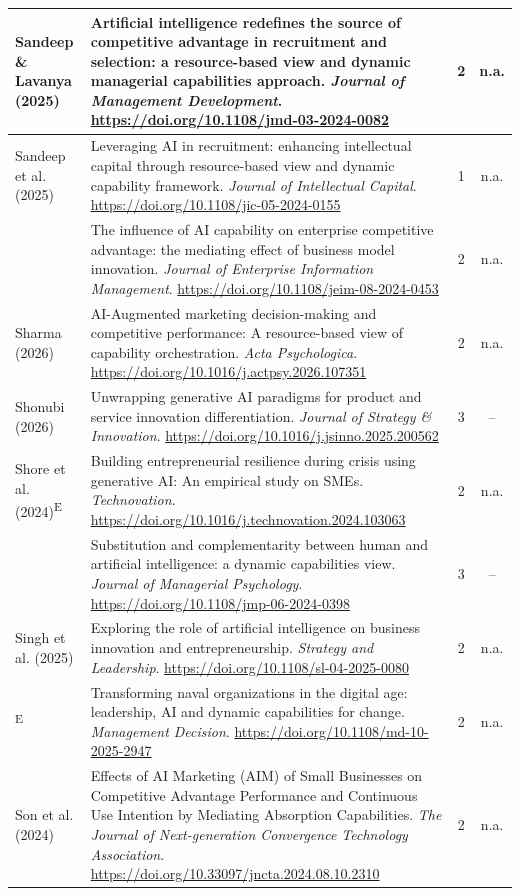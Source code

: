 {\begin{longtable}{|>{\raggedright\arraybackslash}p{2.6cm}|>{\raggedright\arraybackslash}p{10.2cm}|c|c|}
Sandeep \& Lavanya (2025) & Artificial intelligence redefines the source of competitive advantage in recruitment and selection: a resource-based view and dynamic managerial capabilities approach. \textit{Journal of Management Development}. \url{https://doi.org/10.1108/jmd-03-2024-0082} & 2 & n.a. \\ \hline
Sandeep et al. (2025) & Leveraging AI in recruitment: enhancing intellectual capital through resource-based view and dynamic capability framework. \textit{Journal of Intellectual Capital}. \url{https://doi.org/10.1108/jic-05-2024-0155} & 1 & n.a. \\ \hline
\textcite{shao2026} & The influence of AI capability on enterprise competitive advantage: the mediating effect of business model innovation. \textit{Journal of Enterprise Information Management}. \url{https://doi.org/10.1108/jeim-08-2024-0453} & 2 & n.a. \\ \hline
Sharma (2026) & AI-Augmented marketing decision-making and competitive performance: A resource-based view of capability orchestration. \textit{Acta Psychologica}. \url{https://doi.org/10.1016/j.actpsy.2026.107351} & 2 & n.a. \\ \hline
Shonubi (2026) & Unwrapping generative AI paradigms for product and service innovation differentiation. \textit{Journal of Strategy \& Innovation}. \url{https://doi.org/10.1016/j.jsinno.2025.200562} & 3 & -- \\ \hline
Shore et al. (2024)\textsuperscript{E} & Building entrepreneurial resilience during crisis using generative AI: An empirical study on SMEs. \textit{Technovation}. \url{https://doi.org/10.1016/j.technovation.2024.103063} & 2 & n.a. \\ \hline
\textcite{siaw2024} & Substitution and complementarity between human and artificial intelligence: a dynamic capabilities view. \textit{Journal of Managerial Psychology}. \url{https://doi.org/10.1108/jmp-06-2024-0398} & 3 & -- \\ \hline
Singh et al. (2025) & Exploring the role of artificial intelligence on business innovation and entrepreneurship. \textit{Strategy and Leadership}. \url{https://doi.org/10.1108/sl-04-2025-0080} & 2 & n.a. \\ \hline
\textcite{sofiyan2026}\textsuperscript{E} & Transforming naval organizations in the digital age: leadership, AI and dynamic capabilities for change. \textit{Management Decision}. \url{https://doi.org/10.1108/md-10-2025-2947} & 2 & n.a. \\ \hline
Son et al. (2024) & Effects of AI Marketing (AIM) of Small Businesses on Competitive Advantage Performance and Continuous Use Intention by Mediating Absorption Capabilities. \textit{The Journal of Next-generation Convergence Technology Association}. \url{https://doi.org/10.33097/jncta.2024.08.10.2310} & 2 & n.a. \\ \hline

\end{longtable}}
